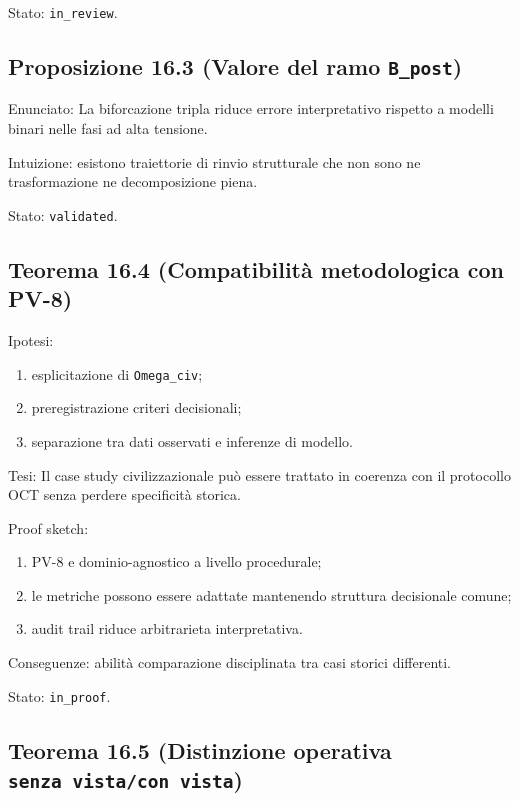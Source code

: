 Stato: \texttt{in\_review}.

\subsection{\texorpdfstring{Proposizione 16.3 (Valore del ramo \texttt{B\_post})}{Proposizione 16.3 (Valore del ramo B\_post)}}

Enunciato:
La biforcazione tripla riduce errore interpretativo rispetto a modelli binari nelle fasi ad alta tensione.

Intuizione:
esistono traiettorie di rinvio strutturale che non sono ne trasformazione ne decomposizione piena.

Stato: \texttt{validated}.

\subsection{Teorema 16.4 (Compatibilità metodologica con PV-8)}

Ipotesi:

\begin{enumerate}
\def\labelenumi{\arabic{enumi}.}
\tightlist
\item
  esplicitazione di \texttt{Omega\_civ};
\item
  preregistrazione criteri decisionali;
\item
  separazione tra dati osservati e inferenze di modello.
\end{enumerate}

Tesi:
Il case study civilizzazionale può essere trattato in coerenza con il protocollo OCT senza perdere specificità storica.

Proof sketch:

\begin{enumerate}
\def\labelenumi{\arabic{enumi}.}
\tightlist
\item
  PV-8 e dominio-agnostico a livello procedurale;
\item
  le metriche possono essere adattate mantenendo struttura decisionale comune;
\item
  audit trail riduce arbitrarieta interpretativa.
\end{enumerate}

Conseguenze:
abilità comparazione disciplinata tra casi storici differenti.

Stato: \texttt{in\_proof}.

\subsection{\texorpdfstring{Teorema 16.5 (Distinzione operativa \texttt{senza\ vista/con\ vista})}{Teorema 16.5 (Distinzione operativa senza vista/con vista)}}

